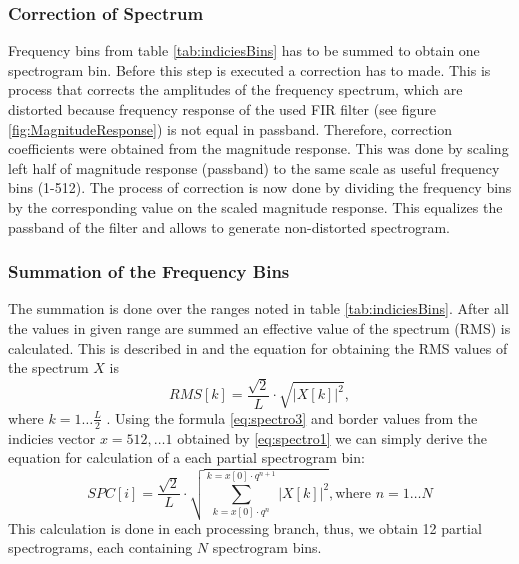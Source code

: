 \documentclass[twoside]{ctuthesis}
\theoremstyle{plain}
\theoremstyle{definition}
\theoremstyle{note}
\begin{document}
\subsubsection{Correction of Spectrum}
Frequency bins from table \ref{tab:indiciesBins} has to be summed to obtain one spectrogram bin. Before this step is executed a correction has to made. This is process that corrects the amplitudes of the frequency spectrum, which are distorted because frequency response of the used FIR filter (see figure \ref{fig:MagnitudeResponse}) is not equal in passband. Therefore, correction coefficients were obtained from the magnitude response. This was done by scaling left half of magnitude response (passband) to the same scale as useful frequency bins (1-512). The process of correction is now done by dividing the frequency bins by the corresponding value on the scaled magnitude response. This equalizes the passband of the filter and allows to generate non-distorted spectrogram.

\subsubsection{Summation of the Frequency Bins}
The summation is done over the ranges noted in table \ref{tab:indiciesBins}. After all the values in given range are summed an effective value of the spectrum (RMS) is calculated. This is described in \cite{cite:1} and the equation for obtaining the RMS values of the spectrum $X$ is  
\begin{equation} \label{eq:spectro3}
RMS[k]=\frac{\sqrt{2}}{L}\cdot \sqrt{|X[k]|^2},
\end{equation}
where $k=1\ldots \frac{L}{2}$ \cite{cite:1}.
Using the formula \ref{eq:spectro3} and border values from the indicies vector $x=512,\ldots1$ obtained by \ref{eq:spectro1} we can simply derive the equation for calculation of a each partial spectrogram bin:
\begin{equation} \label{eq:spectro4}
SPC[i]=\frac{\sqrt{2}}{L}\cdot \sqrt{\sum_{k=x[0]\cdot q^n}^{k=x[0]\cdot q^{n+1}}|X[k]|^2}, \text{where }n=1\ldots N
\end{equation}
This calculation is done in each processing branch, thus, we obtain 12 partial spectrograms, each containing $N$ spectrogram bins.
\end{document}
